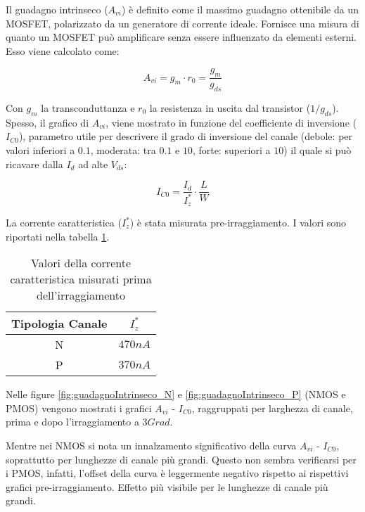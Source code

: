 Il guadagno intrinseco ($A_{vi}$) è definito come il massimo guadagno ottenibile da un MOSFET, polarizzato da un generatore di corrente ideale. Fornisce una misura di quanto un MOSFET può amplificare senza essere influenzato da elementi esterni. Esso viene calcolato come:

$$A_{vi} = g_{m} \cdot r_0 = \frac{g_{m}}{g_{ds}} $$

Con $g_m$ la transconduttanza e $r_0$ la resistenza in uscita dal transistor (${1}/{g_{ds}}$). Spesso, il grafico di $A_{vi}$, viene mostrato in funzione del coefficiente di inversione ($I_{C0}$), parametro utile per descrivere il grado di inversione del canale (debole: per valori inferiori a $0.1$, moderata: tra $0.1$ e $10$, forte: superiori a $10$) il quale si può ricavare dalla $I_d$ ad alte $V_{ds}$:

$$I_{C0} = \frac{I_{d}}{I_{z}^{*}} \cdot \frac{L}{W}$$

La corrente caratteristica ($I_{z}^{*}$) è stata misurata pre-irraggiamento. I valori sono riportati nella tabella \ref{tab:corrente_caratteristica}.

\begin{table}[ht]
    \centering
    \begin{tabular}{c c}
        \toprule
        Tipologia Canale & $I_{z}^{*}$ \\
        \midrule
        N                & $470nA$     \\
        P                & $370nA$     \\
        \bottomrule
    \end{tabular}
    \caption[Valori estratti $I_z^*$]{Valori della corrente caratteristica misurati prima dell'irraggiamento}
    \label{tab:corrente_caratteristica}
\end{table}


Nelle figure \ref{fig:guadagnoIntrinseco_N} e \ref{fig:guadagnoIntrinseco_P} (NMOS e PMOS) vengono mostrati i grafici $A_{vi}$ - $I_{C0}$, raggruppati per larghezza di canale, prima e dopo l'irraggiamento a $3Grad$.

Mentre nei NMOS si nota un innalzamento significativo della curva $A_{vi}$ - $I_{C0}$, soprattutto per lunghezze di canale più grandi. Questo non sembra verificarsi per i PMOS, infatti, l'offset della curva è leggermente negativo rispetto ai rispettivi grafici pre-irraggiamento. Effetto più visibile per le lunghezze di canale più grandi.


